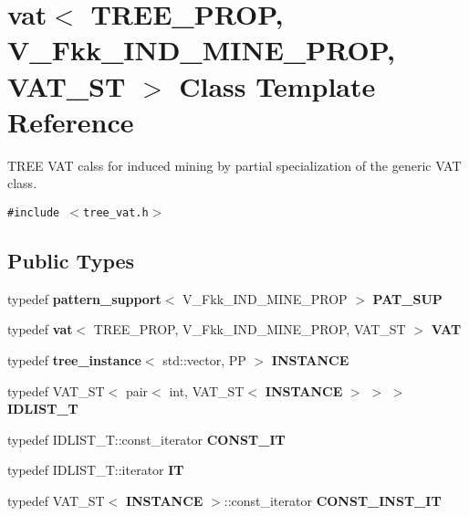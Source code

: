 \section{vat$<$ TREE\_\-PROP, V\_\-Fkk\_\-IND\_\-MINE\_\-PROP, VAT\_\-ST $>$ Class Template Reference}
\label{classvat_3_01TREE__PROP_00_01V__Fkk__IND__MINE__PROP_00_01VAT__ST_01_4}
TREE VAT calss for induced mining by partial specialization of the generic VAT class.  


{\tt \#include $<$tree\_\-vat.h$>$}

\subsection*{Public Types}
\begin{CompactItemize}
\item 
typedef {\bf pattern\_\-support}$<$ V\_\-Fkk\_\-IND\_\-MINE\_\-PROP $>$ {\bf PAT\_\-SUP}\label{classvat_3_01TREE__PROP_00_01V__Fkk__IND__MINE__PROP_00_01VAT__ST_01_4_w0}

\item 
typedef {\bf vat}$<$ TREE\_\-PROP, V\_\-Fkk\_\-IND\_\-MINE\_\-PROP, VAT\_\-ST $>$ {\bf VAT}\label{classvat_3_01TREE__PROP_00_01V__Fkk__IND__MINE__PROP_00_01VAT__ST_01_4_w1}

\item 
typedef {\bf tree\_\-instance}$<$ std::vector, PP $>$ {\bf INSTANCE}\label{classvat_3_01TREE__PROP_00_01V__Fkk__IND__MINE__PROP_00_01VAT__ST_01_4_w2}

\item 
typedef VAT\_\-ST$<$ pair$<$ int, VAT\_\-ST$<$ {\bf INSTANCE} $>$ $>$ $>$ {\bf IDLIST\_\-T}\label{classvat_3_01TREE__PROP_00_01V__Fkk__IND__MINE__PROP_00_01VAT__ST_01_4_w3}

\item 
typedef IDLIST\_\-T::const\_\-iterator {\bf CONST\_\-IT}\label{classvat_3_01TREE__PROP_00_01V__Fkk__IND__MINE__PROP_00_01VAT__ST_01_4_w4}

\item 
typedef IDLIST\_\-T::iterator {\bf IT}\label{classvat_3_01TREE__PROP_00_01V__Fkk__IND__MINE__PROP_00_01VAT__ST_01_4_w5}

\item 
typedef VAT\_\-ST$<$ {\bf INSTANCE} $>$::const\_\-iterator {\bf CONST\_\-INST\_\-IT}\label{classvat_3_01TREE__PROP_00_01V__Fkk__IND__MINE__PROP_00_01VAT__ST_01_4_w6}


\end{CompactItemize}
